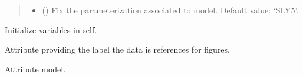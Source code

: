 \documentclass[letterpaper,10pt,english]{sphinxmanual}
\begin{document}
\begin{fulllineitems}
\begin{quote}
\begin{description}
\begin{itemize}
\item {} 
\sphinxAtStartPar
{} (\sphinxstyleliteralemphasis{\sphinxupquote{, }}) \textendash{} Fix the parameterization associated to model.     Default value: ‘SLY5’.

\end{itemize}

\end{description}\end{quote}

\sphinxAtStartPar
{}

\begin{fulllineitems}
\label{\detokenize{source/api/setup_eos_pheno:nucleardatapy.eos.setup_pheno.setupPheno.init_self}}
\pysigstartsignatures
{}
\pysigstopsignatures
\sphinxAtStartPar
Initialize variables in self.

\end{fulllineitems}


\begin{fulllineitems}
\label{\detokenize{source/api/setup_eos_pheno:nucleardatapy.eos.setup_pheno.setupPheno.label}}
\pysigstartsignatures
{}
\pysigstopsignatures
\sphinxAtStartPar
Attribute providing the label the data is references for figures.

\end{fulllineitems}


\begin{fulllineitems}
\label{\detokenize{source/api/setup_eos_pheno:nucleardatapy.eos.setup_pheno.setupPheno.model}}
\pysigstartsignatures
{}
\pysigstopsignatures
\sphinxAtStartPar
Attribute model.

\end{fulllineitems}


\end{fulllineitems}
\end{document}
